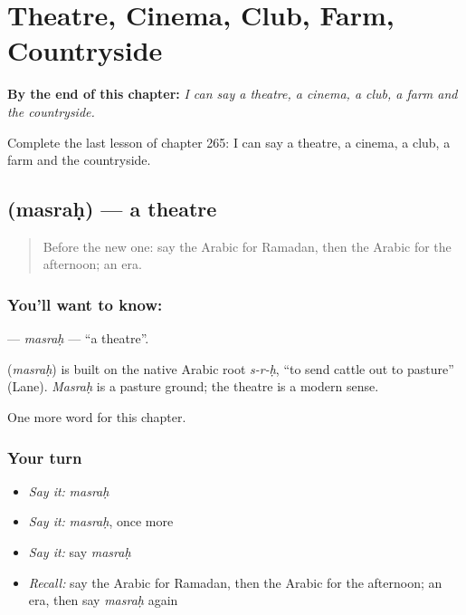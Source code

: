
\chapter{Theatre, Cinema, Club, Farm, Countryside}
\label{ch:ar-theatre-cinema-club-farm-countryside}

\begin{chapteropening}
\textbf{By the end of this chapter:} \emph{I can say a theatre, a cinema, a club, a farm and the countryside.}

Complete the last lesson of chapter 265: I can say a theatre, a cinema, a club, a farm and the countryside.
\end{chapteropening}

\section[\texorpdfstring{\ar{مسرح} (masraḥ)}{مسرح (masraḥ)}]{ (masraḥ) — a theatre}

\label{lesson:AR-C265-masrah}



\begin{quote}
Before the new one: say the Arabic for Ramadan, then the Arabic for the afternoon; an era.
\end{quote}

\subsection*{You'll want to know: }
\textbf{} — \emph{masraḥ} — \textquotedblleft{}a theatre\textquotedblright{}.

\begin{cousinweb}
\textbf{} (\emph{masraḥ}) is built on the native Arabic root \emph{s-r-ḥ}, \textquotedblleft{}to send cattle out to pasture\textquotedblright{} (Lane). \emph{Masraḥ} is a pasture ground; the theatre is a modern sense.
\end{cousinweb}

\begin{grammarlens}[title={What you've built}]
One more word for this chapter.
\end{grammarlens}

\subsection*{Your turn}
\begin{itemize}
\raggedright
  \item \emph{Say it:} \emph{masraḥ}
  \item \emph{Say it:} \emph{masraḥ}, once more
  \item \emph{Say it:} say \emph{masraḥ}
  \item \emph{Recall:} say the Arabic for Ramadan, then the Arabic for the afternoon; an era, then say \emph{masraḥ} again
\end{itemize}

